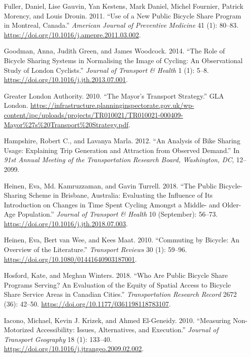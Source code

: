 \documentclass[
]{article}
\newlength{\cslhangindent}
\newenvironment{cslreferences}%
  {\setlength{\parindent}{0pt}%
  \everypar{\setlength{\hangindent}{\cslhangindent}}\ignorespaces}%
  {\par}
\begin{document}
\begin{cslreferences}
\leavevmode\hypertarget{ref-fuller_use_2011}{}%
Fuller, Daniel, Lise Gauvin, Yan Kestens, Mark Daniel, Michel Fournier, Patrick Morency, and Louis Drouin. 2011. ``Use of a New Public Bicycle Share Program in Montreal, Canada.'' \emph{American Journal of Preventive Medicine} 41 (1): 80--83. \url{https://doi.org/10.1016/j.amepre.2011.03.002}.

\leavevmode\hypertarget{ref-goodman_role_2014}{}%
Goodman, Anna, Judith Green, and James Woodcock. 2014. ``The Role of Bicycle Sharing Systems in Normalising the Image of Cycling: An Observational Study of London Cyclists.'' \emph{Journal of Transport \& Health} 1 (1): 5--8. \url{https://doi.org/10.1016/j.jth.2013.07.001}.

\leavevmode\hypertarget{ref-greater_london_authority_mayors_2010}{}%
Greater London Authority. 2010. ``The Mayor's Transport Strategy.'' GLA London. \url{https://infrastructure.planninginspectorate.gov.uk/wp-content/ipc/uploads/projects/TR010021/TR010021-000409-Mayor\%27s\%20Transport\%20Strategy.pdf}.

\leavevmode\hypertarget{ref-hampshire_analysis_2012}{}%
Hampshire, Robert C., and Lavanya Marla. 2012. ``An Analysis of Bike Sharing Usage: Explaining Trip Generation and Attraction from Observed Demand.'' In \emph{91st Annual Meeting of the Transportation Research Board, Washington, DC}, 12--2099.

\leavevmode\hypertarget{ref-heinen_public_2018}{}%
Heinen, Eva, Md. Kamruzzaman, and Gavin Turrell. 2018. ``The Public Bicycle-Sharing Scheme in Brisbane, Australia: Evaluating the Influence of Its Introduction on Changes in Time Spent Cycling Amongst a Middle- and Older-Age Population.'' \emph{Journal of Transport \& Health} 10 (September): 56--73. \url{https://doi.org/10.1016/j.jth.2018.07.003}.

\leavevmode\hypertarget{ref-heinen_commuting_2010}{}%
Heinen, Eva, Bert van Wee, and Kees Maat. 2010. ``Commuting by Bicycle: An Overview of the Literature.'' \emph{Transport Reviews} 30 (1): 59--96. \url{https://doi.org/10.1080/01441640903187001}.

\leavevmode\hypertarget{ref-hosford_who_2018}{}%
Hosford, Kate, and Meghan Winters. 2018. ``Who Are Public Bicycle Share Programs Serving? An Evaluation of the Equity of Spatial Access to Bicycle Share Service Areas in Canadian Cities.'' \emph{Transportation Research Record} 2672 (36): 42--50. \url{https://doi.org/10.1177/0361198118783107}.

\leavevmode\hypertarget{ref-iacono_measuring_2010}{}%
Iacono, Michael, Kevin J. Krizek, and Ahmed El-Geneidy. 2010. ``Measuring Non-Motorized Accessibility: Issues, Alternatives, and Execution.'' \emph{Journal of Transport Geography} 18 (1): 133--40. \url{https://doi.org/10.1016/j.jtrangeo.2009.02.002}.


\end{cslreferences}
\end{document}
